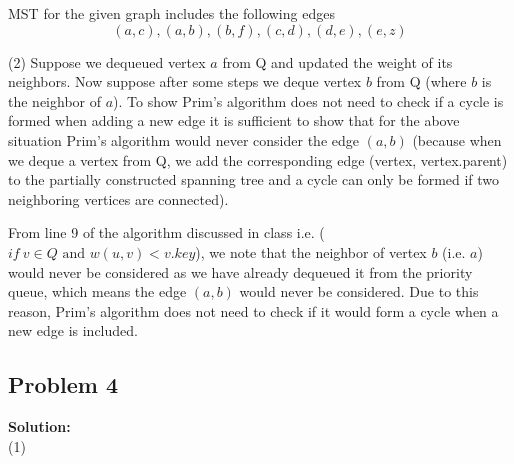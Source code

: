 \documentclass[12pt,a4paper]{article}
\newcommand{\solution}{\noindent\textbf{Solution:}\\\indent}
\begin{document}
MST for the given graph includes the following edges
\begin{equation*}
    (a,c), (a,b), (b,f), (c,d), (d,e), (e,z)
\end{equation*}

(2) Suppose we dequeued vertex $a$ from Q and updated the weight of its neighbors. Now suppose after some steps we deque vertex $b$ from Q (where $b$ is the neighbor of $a$). To show Prim's algorithm does not need to check if a cycle is formed when adding a new edge it is sufficient to show that for the above situation Prim's algorithm would never consider the edge $(a,b)$ (because when we deque a vertex from Q, we add the corresponding edge (vertex, vertex.parent) to the partially constructed spanning tree and a cycle can only be formed if two neighboring vertices are connected).

From line 9 of the algorithm discussed in class i.e. ($if\ v\in Q\text{ and } w(u,v) < v.key$), we note that the neighbor of vertex $b$ (i.e. $a$) would never be considered as we have already dequeued it from the priority queue, which means the edge $(a,b)$ would never be considered. Due to this reason, Prim's algorithm does not need to check if it would form a cycle when a new edge is included.

\subsection*{Problem 4}
\solution
(1) \\
\end{document}
